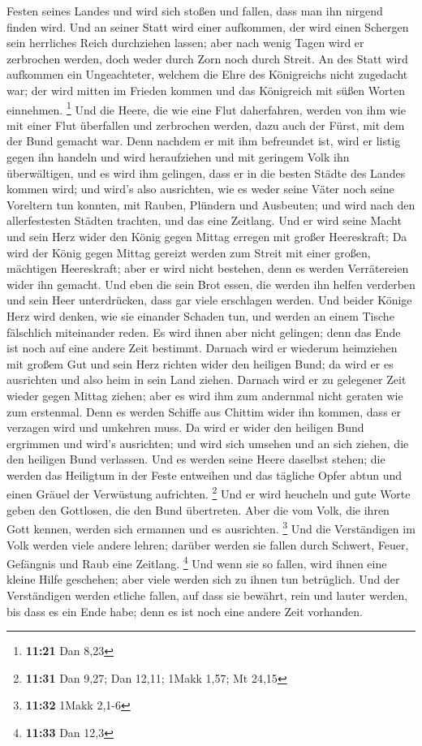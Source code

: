 Festen seines Landes und wird sich stoßen und fallen, dass man ihn
nirgend finden wird.  Und an seiner Statt wird einer
aufkommen, der wird einen Schergen sein herrliches Reich durchziehen
lassen; aber nach wenig Tagen wird er zerbrochen werden, doch weder
durch Zorn noch durch Streit.  An des Statt wird
aufkommen ein Ungeachteter, welchem die Ehre des Königreichs nicht
zugedacht war; der wird mitten im Frieden kommen und das Königreich mit
süßen Worten einnehmen. \footnote{\textbf{11:21} Dan 8,23}
 Und die Heere, die wie eine Flut daherfahren, werden von
ihm wie mit einer Flut überfallen und zerbrochen werden, dazu auch der
Fürst, mit dem der Bund gemacht war.  Denn nachdem er mit
ihm befreundet ist, wird er listig gegen ihn handeln und wird
heraufziehen und mit geringem Volk ihn überwältigen,  und
es wird ihm gelingen, dass er in die besten Städte des Landes kommen
wird; und wird's also ausrichten, wie es weder seine Väter noch seine
Voreltern tun konnten, mit Rauben, Plündern und Ausbeuten; und wird nach
den allerfestesten Städten trachten, und das eine Zeitlang.
 Und er wird seine Macht und sein Herz wider den König
gegen Mittag erregen mit großer Heereskraft; Da wird der König gegen
Mittag gereizt werden zum Streit mit einer großen, mächtigen
Heereskraft; aber er wird nicht bestehen, denn es werden Verrätereien
wider ihn gemacht.  Und eben die sein Brot essen, die
werden ihn helfen verderben und sein Heer unterdrücken, dass gar viele
erschlagen werden.  Und beider Könige Herz wird denken,
wie sie einander Schaden tun, und werden an einem Tische fälschlich
miteinander reden. Es wird ihnen aber nicht gelingen; denn das Ende ist
noch auf eine andere Zeit bestimmt.  Darnach wird er
wiederum heimziehen mit großem Gut und sein Herz richten wider den
heiligen Bund; da wird er es ausrichten und also heim in sein Land
ziehen.  Darnach wird er zu gelegener Zeit wieder gegen
Mittag ziehen; aber es wird ihm zum andernmal nicht geraten wie zum
erstenmal.  Denn es werden Schiffe aus Chittim wider ihn
kommen, dass er verzagen wird und umkehren muss. Da wird er wider den
heiligen Bund ergrimmen und wird's ausrichten; und wird sich umsehen und
an sich ziehen, die den heiligen Bund verlassen.  Und es
werden seine Heere daselbst stehen; die werden das Heiligtum in der
Feste entweihen und das tägliche Opfer abtun und einen Gräuel der
Verwüstung aufrichten. \footnote{\textbf{11:31} Dan 9,27; Dan 12,11;
  1Makk 1,57; Mt 24,15}  Und er wird heucheln und gute
Worte geben den Gottlosen, die den Bund übertreten. Aber die vom Volk,
die ihren Gott kennen, werden sich ermannen und es ausrichten.
\footnote{\textbf{11:32} 1Makk 2,1-6}  Und die
Verständigen im Volk werden viele andere lehren; darüber werden sie
fallen durch Schwert, Feuer, Gefängnis und Raub eine Zeitlang.
\footnote{\textbf{11:33} Dan 12,3}  Und wenn sie so
fallen, wird ihnen eine kleine Hilfe geschehen; aber viele werden sich
zu ihnen tun betrüglich.  Und der Verständigen werden
etliche fallen, auf dass sie bewährt, rein und lauter werden, bis dass
es ein Ende habe; denn es ist noch eine andere Zeit vorhanden.

